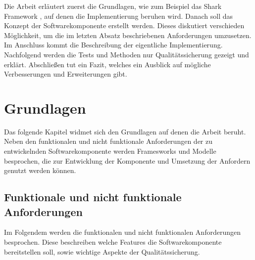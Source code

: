 \documentclass[a4paper]{article}
\begin{document}
	Die Arbeit erläutert zuerst die Grundlagen, wie zum Beispiel das Shark Framework
	\cite{SharkFW},	auf denen die Implementierung beruhen wird. 
	Danach soll das Konzept	der Softwarekomponente erstellt werden. Dieses diskutiert
	verschieden Möglichkeit, um die im letzten Absatz beschriebenen Anforderungen
	umzusetzen.	Im Anschluss kommt die Beschreibung der eigentliche Implementierung.
	Nachfolgend werden die Tests und Methoden nur Qualitätssicherung gezeigt und
	erklärt. Abschließen tut ein Fazit, welches ein Ausblick auf mögliche
	Verbesserungen und Erweiterungen gibt.

	\newpage
	\section{Grundlagen}
	
	Das folgende Kapitel widmet sich den Grundlagen auf denen die Arbeit
	beruht. Neben den funktionalen und nicht funktionale Anforderungen
	der zu entwickelnden Softwarekomponente werden Framesworks und Modelle
	besprochen, die zur Entwicklung der Komponente und Umsetzung der Anfordern
	genutzt werden können. 
	
	\subsection{Funktionale und nicht funktionale Anforderungen}
	\label{sec:requirements}
	
	Im Folgendem werden die funktionalen und nicht funktionalen
	Anforderungen besprochen. Diese	beschreiben welche Features die
	Softwarekomponente bereitstellen soll, sowie wichtige Aspekte der
	Qualitätssicherung.
	
\end{document}
